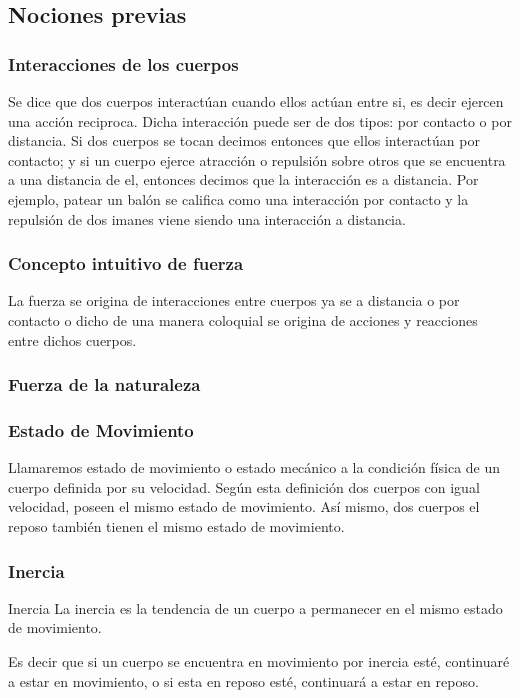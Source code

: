 \subsection*{Nociones previas}
\subsubsection*{Interacciones de los cuerpos}
Se dice que dos cuerpos interactúan cuando ellos actúan entre si, es decir ejercen una acción reciproca. Dicha interacción puede ser de dos tipos:
por contacto o por distancia. Si dos cuerpos se tocan decimos entonces que ellos interactúan por contacto; y si un cuerpo ejerce atracción o repulsión sobre otros que se encuentra a una distancia de el, entonces decimos que la interacción es a distancia. Por ejemplo, patear un balón se califica como una interacción por contacto y la repulsión de dos imanes viene siendo una interacción a distancia.
\subsubsection*{Concepto intuitivo de fuerza}
La fuerza se origina de interacciones entre cuerpos ya se a distancia o por contacto o dicho de una manera coloquial se origina de acciones y reacciones entre dichos cuerpos.
\subsubsection*{Fuerza de la naturaleza}
\subsubsection*{Estado de Movimiento}
Llamaremos estado de movimiento o estado mecánico a la condición física de un cuerpo definida por su velocidad.
Según esta definición dos cuerpos con igual velocidad, poseen el mismo estado de movimiento. Así mismo, dos cuerpos el reposo también tienen el mismo estado de movimiento.
\subsubsection*{Inercia}
\begin{Theorem*} {Inercia}
	La inercia es la tendencia de un cuerpo a permanecer en el mismo estado de movimiento.
\end{Theorem*}
Es decir que si un cuerpo se encuentra en movimiento por inercia esté, continuaré a estar en movimiento, o si esta en reposo esté, continuará a estar en reposo.
